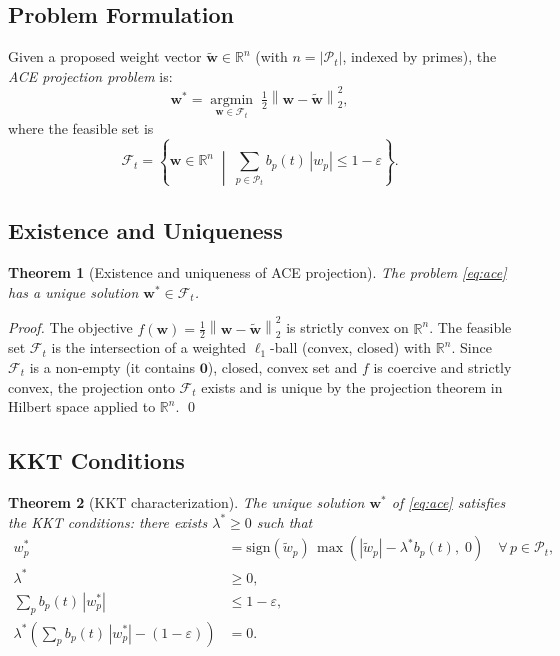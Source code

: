 \documentclass[12pt,letterpaper]{article}
\newtheorem{theorem}{Theorem}[section]
\newcommand{\Hnorm}[1]{\left\|#1\right\|}
\newcommand{\bp}{b_p(t)}
\newcommand{\Pt}{\mathcal{P}_t}
\newcommand{\Fcal}{\mathcal{F}_t}
\newcommand{\eps}{\varepsilon}
\newcommand{\R}{\mathbb{R}}
\newcommand{\lamstar}{\lambda^*}
\begin{document}
\subsection{Problem Formulation}

Given a proposed weight vector $\tilde{\mathbf{w}} \in \R^n$ (with
$n = |\Pt|$, indexed by primes), the \emph{ACE projection problem} is:
\begin{equation}
  \mathbf{w}^* = \operatorname*{argmin}_{\mathbf{w} \in \Fcal}
  \;\tfrac{1}{2}\Hnorm{\mathbf{w} - \tilde{\mathbf{w}}}_2^2, \label{eq:ace}
\end{equation}
where the feasible set is
\begin{equation}
  \Fcal = \left\{\mathbf{w} \in \R^n \;\middle|\;
    \sum_{p \in \Pt} \bp\, |w_p| \leq 1-\eps \right\}. \label{eq:feasible}
\end{equation}

\subsection{Existence and Uniqueness}

\begin{theorem}[Existence and uniqueness of ACE projection]
\label{thm:ace-unique}
The problem \eqref{eq:ace} has a unique solution $\mathbf{w}^* \in \Fcal$.
\end{theorem}

\begin{proof}
The objective $f(\mathbf{w}) = \tfrac{1}{2}\Hnorm{\mathbf{w} -
\tilde{\mathbf{w}}}_2^2$ is strictly convex on $\R^n$.
The feasible set $\Fcal$ is the intersection of a weighted
$\ell_1$-ball (convex, closed) with $\R^n$. Since $\Fcal$ is a
non-empty (it contains $\mathbf{0}$), closed, convex set and $f$ is
coercive and strictly convex, the projection onto $\Fcal$ exists and is
unique by the projection theorem in Hilbert space applied to $\R^n$.
\qed
\end{proof}

\subsection{KKT Conditions}

\begin{theorem}[KKT characterization]
\label{thm:kkt}
The unique solution $\mathbf{w}^*$ of \eqref{eq:ace} satisfies the
KKT conditions: there exists $\lamstar \geq 0$ such that
\begin{align}
  w_p^* &= \mathrm{sign}(\tilde{w}_p)\,
    \max\!\left(|\tilde{w}_p| - \lamstar \bp,\; 0\right)
    \quad \forall\, p \in \Pt, \label{eq:kkt-primal}\\
  \lamstar &\geq 0, \label{eq:kkt-dual1}\\
  \sum_{p} \bp\, |w_p^*| &\leq 1-\eps, \label{eq:kkt-primal-feas}\\
  \lamstar\!\left(\sum_{p} \bp\, |w_p^*| - (1-\eps)\right) &= 0.
    \label{eq:kkt-compl}
\end{align}
\end{theorem}
\end{document}
